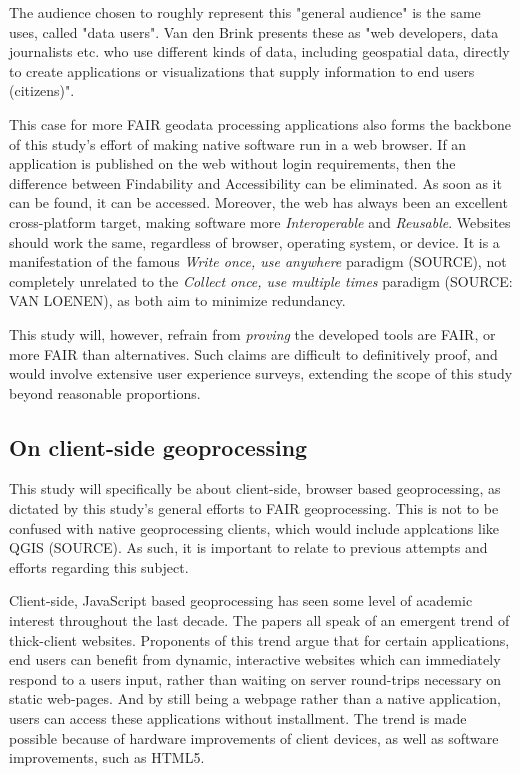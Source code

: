 The audience chosen to roughly represent this "general audience" is the same \cite{brink_geospatial_2018} uses, called "data users". Van den Brink presents these as "web developers, data journalists etc. who use different kinds of data, including geospatial data, directly to create applications or visualizations that supply information to end users (citizens)".

This case for more FAIR geodata processing applications also forms the backbone of this study's effort of making native software run in a web browser. If an application is published on the web without login requirements, then the difference between Findability and Accessibility can be eliminated. As soon as it can be found, it can be accessed. 
Moreover, the web has always been an excellent cross-platform target, making software more \textit{Interoperable} and \textit{Reusable}. 
Websites should work the same, regardless of browser, operating system, or device. 
It is a manifestation of the famous \textit{Write once, use anywhere} paradigm (SOURCE), not completely unrelated to the \textit{Collect once, use multiple times} paradigm (SOURCE: VAN LOENEN), as both aim to minimize redundancy.

This study will, however, refrain from \textit{proving} the developed tools are FAIR, or more FAIR than alternatives. Such claims are difficult to definitively proof, and would involve extensive user experience surveys, extending the scope of this study beyond reasonable proportions.  




\subsection{On client-side geoprocessing}

This study will specifically be about client-side, browser based geoprocessing, as dictated by this study's general efforts to FAIR geoprocessing. This is not to be confused with native geoprocessing clients, which would include applcations like QGIS (SOURCE). As such, it is important to relate to previous attempts and efforts regarding this subject. 

Client-side, JavaScript based geoprocessing has seen some level of academic interest throughout the last decade. The papers \cite{hamilton_client-side_2014, panidi_hybrid_2015, kulawiak_analysis_2019} all speak of an emergent trend of thick-client websites. Proponents of this trend argue that for certain applications, end users can benefit from dynamic, interactive websites which can immediately respond to a users input, rather than waiting on server round-trips necessary on static web-pages. And by still being a webpage rather than a native application, users can access these applications without installment. The trend is made possible because of hardware improvements of client devices, as well as software improvements, such as HTML5. 

